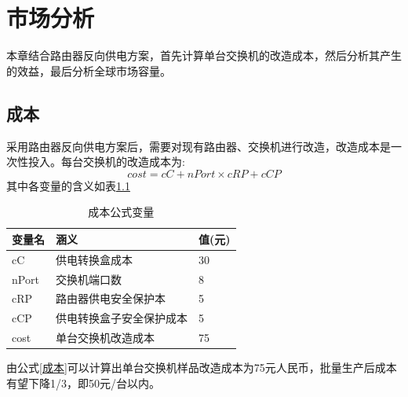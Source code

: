 \documentclass[12pt,a4paper]{report}
\begin{document}
\chapter{市场分析}
本章结合路由器反向供电方案，首先计算单台交换机的改造成本，然后分析其产生的效益，最后分析全球市场容量。
\section{成本}
采用路由器反向供电方案后，需要对现有路由器、交换机进行改造，改造成本是一次性投入。每台交换机的改造成本为:
\begin{equation}
    cost = cC + nPort \times cRP + cCP
    \label{成本}
\end{equation}
其中各变量的含义如表\ref{成本公式变量}
\begin{table}[!hbp]
    \begin{center}
        \begin{tabular}{|l|l|l|}
            \hline
            变量名 & 涵义 & 值(元) \\
            \hline
            cC & 供电转换盒成本 & 30 \\
            \hline
            nPort & 交换机端口数 & 8 \\
            \hline
            cRP & 路由器供电安全保护本 & 5 \\
            \hline
            cCP & 供电转换盒子安全保护成本 & 5 \\
            \hline
            cost & 单台交换机改造成本 & 75 \\
            \hline
        \end{tabular}
        \caption{成本公式变量\label{成本公式变量}}
    \end{center}
\end{table}
由公式\ref{成本}可以计算出单台交换机样品改造成本为75元人民币，批量生产后成本有望下降1/3，即50元/台以内。
\end{document}
